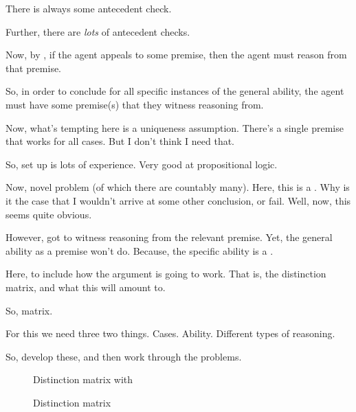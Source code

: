 \begin{note}
  There is always some antecedent check.

  Further, there are \emph{lots} of antecedent checks.

  Now, by \ESU{}, if the agent appeals to some premise, then the agent must reason from that premise.

  So, in order to conclude for all specific instances of the general ability, the agent must have some premise(s) that they witness reasoning from.

  Now, what's tempting here is a uniqueness assumption.
  There's a single premise that works for all cases.
  But I don't think I need that.
  
\end{note}

\begin{note}
  So, set up is lots of experience.
  Very good at propositional logic.

  Now, novel problem (of which there are countably many).
  Here, this is a \requ{}.
  Why is it the case that I wouldn't arrive at some other conclusion, or fail.
  Well, now, this seems quite obvious.

  However, \ESU{} got to witness reasoning from the relevant premise.
  Yet, the general ability as a premise won't do.
  Because, the specific ability is a \requ{}.
\end{note}

\begin{note}
  Here, to include how the argument is going to work.
  That is, the distinction matrix, and what this will amount to.

  So, matrix.

  For this we need three two things.
  Cases.
  Ability.
  Different types of reasoning.

  So, develop these, and then work through the problems.
\end{note}

\begin{note}
  \begin{figure}[H]
    \centering
    \saMtxInterpreted{}
    \caption{Distinction matrix with }
    \label{fig:saMtxInterpreted}
  \end{figure}
\end{note}

\begin{note}
  \begin{figure}[H]
    \centering
    \saMtxRuledOut{}
    \caption{Distinction matrix}
    \label{fig:saMtxRuledOut}
  \end{figure}
\end{note}

